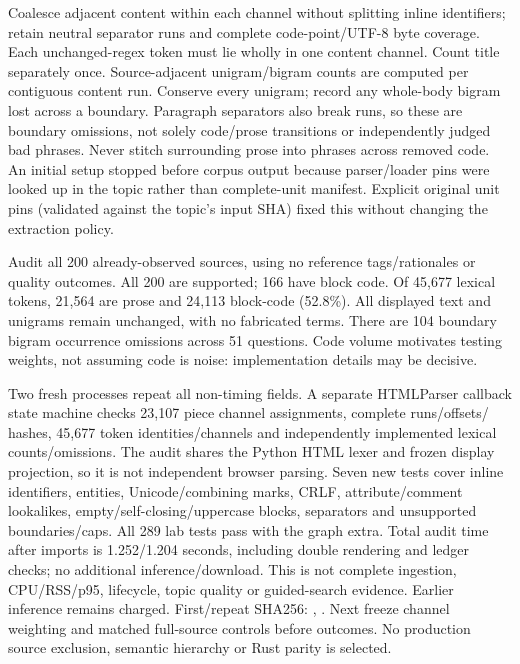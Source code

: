 \documentclass[11pt]{article}
\begin{document}
Coalesce adjacent content within each channel without splitting inline
identifiers; retain neutral separator runs and complete code-point/UTF-8 byte
coverage. Each unchanged-regex token must lie wholly in one content channel.
Count title separately once. Source-adjacent unigram/bigram counts are computed
per contiguous content run. Conserve every unigram; record any whole-body bigram
lost across a boundary. Paragraph separators also break runs, so these are
boundary omissions, not solely code/prose transitions or independently judged
bad phrases. Never stitch surrounding prose into phrases across removed code.
An initial setup stopped before corpus output because parser/loader pins were
looked up in the topic rather than complete-unit manifest. Explicit original
unit pins (validated against the topic's input SHA) fixed this without changing
the extraction policy.

Audit all 200 already-observed sources, using no reference tags/rationales or
quality outcomes. All 200 are supported; 166 have block code. Of 45,677 lexical
tokens, 21,564 are prose and 24,113 block-code (52.8\%). All displayed text and
unigrams remain unchanged, with no fabricated terms. There are 104 boundary
bigram occurrence omissions across 51 questions. Code volume motivates testing
weights, not assuming code is noise: implementation details may be decisive.

Two fresh processes repeat all non-timing fields. A separate HTMLParser callback
state machine checks 23,107 piece channel assignments, complete runs/offsets/
hashes, 45,677 token identities/channels and independently implemented lexical
counts/omissions. The audit shares the Python HTML lexer and frozen display
projection, so it is not independent browser parsing. Seven new tests cover
inline identifiers, entities, Unicode/combining marks, CRLF, attribute/comment
lookalikes, empty/self-closing/uppercase blocks, separators and unsupported
boundaries/caps. All 289 lab tests pass with the graph extra. Total audit time
after imports is 1.252/1.204 seconds, including double rendering and ledger checks;
no additional inference/download. This is not complete ingestion, CPU/RSS/p95,
lifecycle, topic quality or guided-search evidence. Earlier inference remains
charged. First/repeat SHA256:
,
.
Next freeze channel weighting and matched full-source controls before outcomes.
No production source exclusion, semantic hierarchy or Rust parity is selected.
\end{document}
